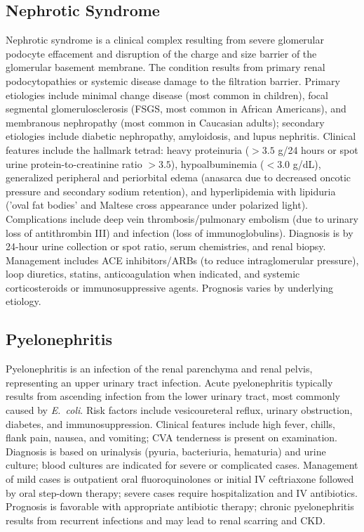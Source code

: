 \subsection{Nephrotic Syndrome}
\label{sec:Nephrotic Syndrome}
Nephrotic syndrome is a clinical complex resulting from severe glomerular podocyte effacement and disruption of the charge and size barrier of the glomerular basement membrane. The condition results from primary renal podocytopathies or systemic disease damage to the filtration barrier. Primary etiologies include minimal change disease (most common in children), focal segmental glomerulosclerosis (FSGS, most common in African Americans), and membranous nephropathy (most common in Caucasian adults); secondary etiologies include diabetic nephropathy, amyloidosis, and lupus nephritis. Clinical features include the hallmark tetrad: heavy proteinuria ($>3.5$ g/24 hours or spot urine protein-to-creatinine ratio $>3.5$), hypoalbuminemia ($<3.0$ g/dL), generalized peripheral and periorbital edema (anasarca due to decreased oncotic pressure and secondary sodium retention), and hyperlipidemia with lipiduria ('oval fat bodies' and Maltese cross appearance under polarized light). Complications include deep vein thrombosis/pulmonary embolism (due to urinary loss of antithrombin III) and infection (loss of immunoglobulins). Diagnosis is by 24-hour urine collection or spot ratio, serum chemistries, and renal biopsy. Management includes ACE inhibitors/ARBs (to reduce intraglomerular pressure), loop diuretics, statins, anticoagulation when indicated, and systemic corticosteroids or immunosuppressive agents. Prognosis varies by underlying etiology.

\subsection{Pyelonephritis}
\label{sec:Pyelonephritis}
Pyelonephritis is an infection of the renal parenchyma and renal pelvis, representing an upper urinary tract infection. Acute pyelonephritis typically results from ascending infection from the lower urinary tract, most commonly caused by \textit{E.~coli}. Risk factors include vesicoureteral reflux, urinary obstruction, diabetes, and immunosuppression. Clinical features include high fever, chills, flank pain, nausea, and vomiting; CVA tenderness is present on examination. Diagnosis is based on urinalysis (pyuria, bacteriuria, hematuria) and urine culture; blood cultures are indicated for severe or complicated cases. Management of mild cases is outpatient oral fluoroquinolones or initial IV ceftriaxone followed by oral step-down therapy; severe cases require hospitalization and IV antibiotics. Prognosis is favorable with appropriate antibiotic therapy; chronic pyelonephritis results from recurrent infections and may lead to renal scarring and CKD.

